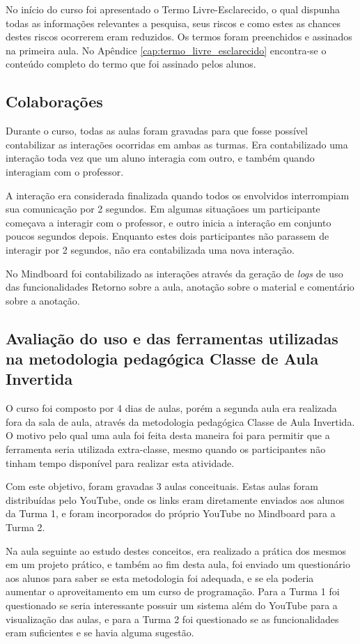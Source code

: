 No início do curso foi apresentado o Termo Livre-Esclarecido, o qual dispunha todas as informações relevantes a pesquisa, seus riscos e como estes as chances destes riscos ocorrerem eram reduzidos. Os termos foram preenchidos e assinados na primeira aula. No Apêndice \ref{cap:termo_livre_esclarecido} encontra-se o conteúdo completo do termo que foi assinado pelos alunos.

\subsection{Colaborações}

Durante o curso, todas as aulas foram gravadas para que fosse possível contabilizar as interações ocorridas em ambas as turmas. Era contabilizado uma interação toda vez que um aluno interagia com outro, e também quando interagiam com o professor.

A interação era considerada finalizada quando todos os envolvidos interrompiam sua comunicação por 2 segundos. Em algumas situaçãoes um participante começava a interagir com o professor, e outro inicia a interação em conjunto poucos segundos depois. Enquanto estes dois participantes não parassem de interagir por 2 segundos, não era contabilizada uma nova interação.

No Mindboard foi contabilizado as interações através da geração de \emph{logs} de uso das funcionalidades Retorno sobre a aula, anotação sobre o material e comentário sobre a anotação.

\subsection{Avaliação do uso e das ferramentas utilizadas na metodologia pedagógica Classe de Aula Invertida}

O curso foi composto por 4 dias de aulas, porém a segunda aula era realizada fora da sala de aula, através da metodologia pedagógica Classe de Aula Invertida. O motivo pelo qual uma aula foi feita desta maneira foi para permitir que a ferramenta seria utilizada extra-classe, mesmo quando os participantes não tinham tempo disponível para realizar esta atividade.

Com este objetivo, foram gravadas 3 aulas conceituais. Estas aulas foram distribuídas pelo YouTube, onde os links eram diretamente enviados aos alunos da Turma 1, e foram incorporados do próprio YouTube no Mindboard para a Turma 2.

Na aula seguinte ao estudo destes conceitos, era realizado a prática dos mesmos em um projeto prático, e também ao fim desta aula, foi enviado um questionário aos alunos para saber se esta metodologia foi adequada, e se ela poderia aumentar o aproveitamento em um curso de programação. Para a Turma 1 foi questionado se seria interessante possuir um sistema além do YouTube para a visualização das aulas, e para a Turma 2 foi questionado se as funcionalidades eram suficientes e se havia alguma sugestão.

